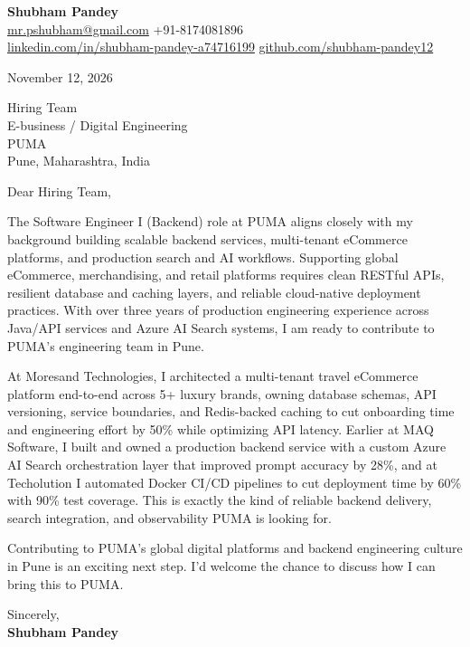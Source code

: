\documentclass[a4paper,11pt]{article}
\begin{document}
\textbf{\Large Shubham Pandey}\\
\href{mailto:mr.pshubham@gmail.com}{mr.pshubham@gmail.com} \quad +91-8174081896\\
\href{https://www.linkedin.com/in/shubham-pandey-a74716199/}{linkedin.com/in/shubham-pandey-a74716199} \quad
\href{https://github.com/shubham-pandey12}{github.com/shubham-pandey12}

\vspace{1em}
November 12, 2026

\vspace{1em}
Hiring Team\\
E-business / Digital Engineering\\
PUMA\\
Pune, Maharashtra, India

\vspace{1em}
Dear Hiring Team,

The Software Engineer I (Backend) role at PUMA aligns closely with my background building scalable backend services, multi-tenant eCommerce platforms, and production search and AI workflows. Supporting global eCommerce, merchandising, and retail platforms requires clean RESTful APIs, resilient database and caching layers, and reliable cloud-native deployment practices. With over three years of production engineering experience across Java/API services and Azure AI Search systems, I am ready to contribute to PUMA's engineering team in Pune.

At Moresand Technologies, I architected a multi-tenant travel eCommerce platform end-to-end across 5+ luxury brands, owning database schemas, API versioning, service boundaries, and Redis-backed caching to cut onboarding time and engineering effort by 50\% while optimizing API latency. Earlier at MAQ Software, I built and owned a production backend service with a custom Azure AI Search orchestration layer that improved prompt accuracy by 28\%, and at Techolution I automated Docker CI/CD pipelines to cut deployment time by 60\% with 90\% test coverage. This is exactly the kind of reliable backend delivery, search integration, and observability PUMA is looking for.

Contributing to PUMA's global digital platforms and backend engineering culture in Pune is an exciting next step. I'd welcome the chance to discuss how I can bring this to PUMA.

\vspace{1em}
Sincerely,\\[0.5em]
\textbf{Shubham Pandey}
\end{document}
